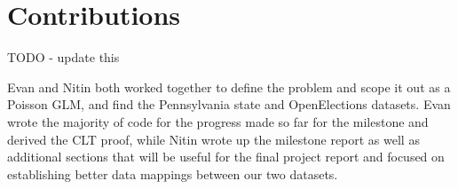 \documentclass[10pt, letterpaper]{article}
\begin{document}
\newpage
\section{Contributions}
TODO - update this

Evan and Nitin both worked together to define the problem and scope it out as a Poisson GLM, and find the Pennsylvania state and OpenElections datasets. Evan wrote the majority of code for the progress made so far for the milestone and derived the CLT proof, while Nitin wrote up the milestone report as well as additional sections that will be useful for the final project report and focused on establishing better data mappings between our two datasets.

{\small


}
\end{document}
